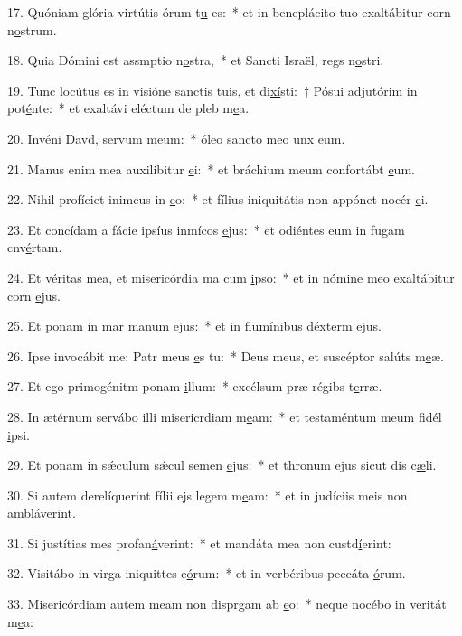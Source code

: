 17. Quóniam glória virtútis órum t\uline{u} es:~* et in beneplácito tuo exaltábitur corn n\uline{o}strum.\par 
18. Quia Dómini est assmptio n\uline{o}stra,~* et Sancti Israël, regs n\uline{o}stri.\par 
19. Tunc locútus es in visióne sanctis tuis, et di\uline{xí}sti:~† Pósui adjutórim in pot\uline{é}nte:~* et exaltávi eléctum de pleb m\uline{e}a.\par 
20. Invéni Davd, servum m\uline{e}um:~* óleo sancto meo unx \uline{e}um.\par 
21. Manus enim mea auxilibitur \uline{e}i:~* et bráchium meum confortábt \uline{e}um.\par 
22. Nihil profíciet inimcus in \uline{e}o:~* et fílius iniquitátis non appónet nocér \uline{e}i.\par 
23. Et concídam a fácie ipsíus inmícos \uline{e}jus:~* et odiéntes eum in fugam cnv\uline{é}rtam.\par 
24. Et véritas mea, et misericórdia ma cum \uline{i}pso:~* et in nómine meo exaltábitur corn \uline{e}jus.\par 
25. Et ponam in mar manum \uline{e}jus:~* et in flumínibus déxterm \uline{e}jus.\par 
26. Ipse invocábit me: Patr meus \uline{e}s tu:~* Deus meus, et suscéptor salúts m\uline{e}æ.\par 
27. Et ego primogénitm ponam \uline{i}llum:~* excélsum præ régibs t\uline{e}rræ.\par 
28. In ætérnum servábo illi misericrdiam m\uline{e}am:~* et testaméntum meum fidél \uline{i}psi.\par 
29. Et ponam in sǽculum sǽcul semen \uline{e}jus:~* et thronum ejus sicut dis c\uline{æ}li.\par 
30. Si autem derelíquerint fílii ejs legem m\uline{e}am:~* et in judíciis meis non ambl\uline{á}verint.\par 
31. Si justítias mes profan\uline{á}verint:~* et mandáta mea non custd\uline{í}erint:\par 
32. Visitábo in virga iniquittes e\uline{ó}rum:~* et in verbéribus peccáta \uline{ó}rum.\par 
33. Misericórdiam autem meam non disprgam ab \uline{e}o:~* neque nocébo in veritát m\uline{e}a:\par 
